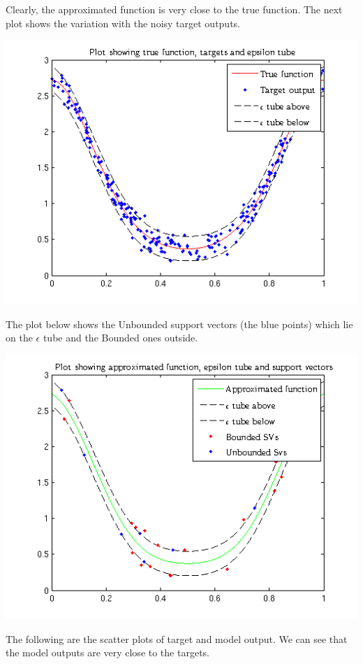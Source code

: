 \documentclass{article}
\begin{document}
Clearly, the approximated function is very close to the true function. The next plot shows the variation with the noisy target outputs.
\begin{center}
\includegraphics[scale=1]{Regression/nu/plot_2}
\end{center}
The plot below shows the Unbounded support vectors (the blue points) which lie on the $\epsilon$ tube and the Bounded ones outside.
\begin{center}
\includegraphics[scale=1]{Regression/nu/plot_3}
\end{center}
The following are the scatter plots of target and model output. We can see that the model outputs are very close to the targets. 
\end{document}
